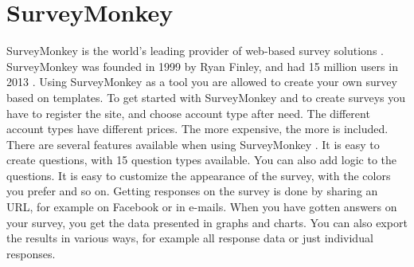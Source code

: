 \section{SurveyMonkey}
SurveyMonkey is the world's leading provider of web-based survey solutions \cite{surveymonkeyaboutus}. SurveyMonkey was founded in 1999 by Ryan Finley, and had 15 million users in 2013 \cite{surveymonkeywiki}. Using SurveyMonkey as a tool you are allowed to create your own survey based on templates. To get started with SurveyMonkey and to create surveys you have to register the site, and choose account type after need. The different account types have different prices. The more expensive, the more is included. There are several features available when using SurveyMonkey \cite{surveymonkeyfeatures}. It is easy to create questions, with 15 question types available. You can also add logic to the questions. It is easy to customize the appearance of the survey, with the colors you prefer and so on. Getting responses on the survey is done by sharing an URL, for example on Facebook or in e-mails. When you have gotten answers on your survey, you get the data presented in graphs and charts. You can also export the results in various ways, for example all response data or just individual responses.

